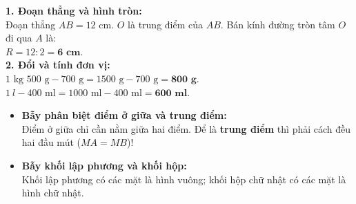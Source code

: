\documentclass[11pt,a4paper]{article}
\begin{document}
\vspace{-2.5mm}
\noindent
\begin{minipage}[t]{0.49\textwidth}\vspace{0pt}
\begin{tcolorbox}[
  enhanced,
  colback=green!4!white,
  colframe=green!60!black,
  arc=2mm, boxrule=0.8pt,
  left=2mm, right=2mm, top=1.8mm, bottom=1.8mm,
  title={\footnotesize\bfseries\color{white}\faCheckCircle\ Ví dụ thực hành chuẩn mực}
]
{\footnotesize
\textbf{1. Đoạn thẳng và hình tròn:}\\
Đoạn thẳng $AB = 12\text{ cm}$. $O$ là trung điểm của $AB$. Bán kính đường tròn tâm $O$ đi qua $A$ là:\\
$R = 12 : 2 = \mathbf{6\text{ cm}}$.\\
\textbf{2. Đổi và tính đơn vị:}\\
$1\text{ kg } 500\text{ g} - 700\text{ g} = 1500\text{ g} - 700\text{ g} = \mathbf{800\text{ g}}$.\\
$1\ l - 400\text{ ml} = 1000\text{ ml} - 400\text{ ml} = \mathbf{600\text{ ml}}$.
}
\end{tcolorbox}
\end{minipage}
\hfill
\begin{minipage}[t]{0.49\textwidth}\vspace{0pt}
\begin{tcolorbox}[
  enhanced,
  colback=red!4!white,
  colframe=red!70!black,
  arc=2mm, boxrule=0.8pt,
  left=2mm, right=2mm, top=1.8mm, bottom=1.8mm,
  title={\footnotesize\bfseries\color{white}\faExclamationTriangle\ Mẹo tránh bẫy trắc nghiệm}
]
{\footnotesize
\begin{itemize}\setlength{\itemsep}{1.5pt}\setlength{\leftskip}{-2.5mm}
  \item \textbf{Bẫy phân biệt điểm ở giữa và trung điểm:}\\
  Điểm ở giữa chỉ cần nằm giữa hai điểm. Để là \textbf{trung điểm} thì phải cách đều hai đầu mút ($MA = MB$)!
  \item \textbf{Bẫy khối lập phương và khối hộp:}\\
  Khối lập phương có các mặt là hình vuông; khối hộp chữ nhật có các mặt là hình chữ nhật.
\end{itemize}
}
\end{tcolorbox}
\end{minipage}
\end{document}
